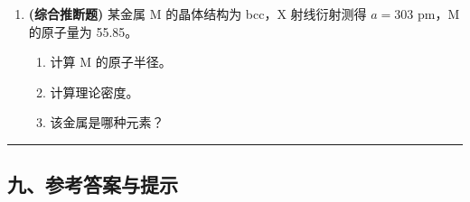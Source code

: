\begin{enumerate}
  \begin{enumerate}
  \def\labelenumii{(\alph{enumii})}
  \tightlist
  \item
    计算半径比。
  \item
    预测其可能的结构类型。
  \item
    若 A = Ti, B = O，画出晶胞示意并计算每个晶胞中的化学式单位数。
  \end{enumerate}
\item
  \textbf{(综合推断题)} 某金属 M 的晶体结构为 bcc，X 射线衍射测得 \(a = 303\) pm，M 的原子量为 55.85。

  \begin{enumerate}
  \def\labelenumii{(\alph{enumii})}
  \tightlist
  \item
    计算 M 的原子半径。
  \item
    计算理论密度。
  \item
    该金属是哪种元素？
  \end{enumerate}
\end{enumerate}

\begin{center}\rule{0.5\linewidth}{0.5pt}\end{center}

\subsection{九、参考答案与提示}\label{ux4e5dux53c2ux8003ux7b54ux6848ux4e0eux63d0ux793a}

